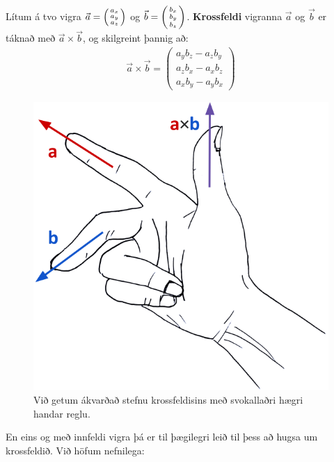 \ifdefined \wholebook \else\documentclass[oneside]{book}\usepackage{EdlBook}\graphicspath{{figures/}}
\begin{document}
\begin{tcolorbox}
\begin{definition}
Lítum á tvo vigra $\Vec{a} = \smqty(a_x \\ a_y \\ a_z)$ og $\Vec{b} = \smqty(b_x \\ b_y \\ b_z)$. \textbf{Krossfeldi} vigranna $\Vec{a}$ og $\Vec{b}$ er táknað með $\Vec{a} \times \Vec{b}$, og skilgreint þannig að:
\begin{align*}
    \Vec{a} \times \Vec{b} = \begin{pmatrix}
    a_y b_z - a_z b_y \\
    a_zb_x - a_x b_z \\
    a_x b_y - a_y b_x
    \end{pmatrix}
\end{align*}
\end{definition}
\end{tcolorbox}

\begin{figure}[H]
    \centering
    \includegraphics[scale = 0.2]{temp/hhr.png}
    \caption{Við getum ákvarðað stefnu krossfeldisins með svokallaðri hægri handar reglu.}
    \label{fig:rhr}
\end{figure}

En eins og með innfeldi vigra þá er til þægilegri leið til þess að hugsa um krossfeldið. Við höfum nefnilega:
\end{document}
